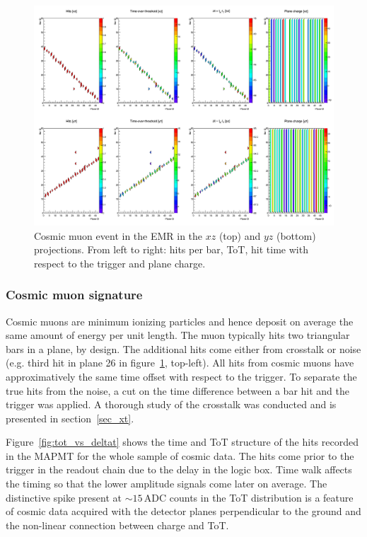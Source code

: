 \documentclass[a4paper,11pt]{article}
\begin{document}
\begin{figure}[!htr]
\centering
\includegraphics[width=\textwidth]{cosmic_event.png}
\caption{Cosmic muon event in the EMR in the $xz$ (top) and $yz$ (bottom) projections. From left to right: hits per bar, ToT, hit time
with respect to the trigger and plane charge.}
\label{fig:cosmic_muon}
\end{figure}

\subsubsection{Cosmic muon signature}\label{sec:cosmic_sig}
Cosmic muons are minimum ionizing particles and hence deposit on average the same amount of energy per unit length. The muon typically hits two triangular
bars in a plane, by design. The additional hits come either from crosstalk or noise (e.g. third hit in plane 26 in figure~\ref{fig:cosmic_muon}, top-left).
All hits from cosmic muons have approximatively the same time offset with respect to the trigger. To separate the true hits from the noise, a cut on
the time difference between a bar hit and the trigger was applied. A thorough study of the crosstalk was conducted and is presented in section~\ref{sec_xt}.
 
Figure~\ref{fig:tot_vs_deltat} shows the time and ToT structure of the hits recorded in the MAPMT for the whole sample of cosmic data. The hits come prior
to the trigger in the readout chain due to the delay in the logic box. Time walk affects the timing so that the lower amplitude signals come later on
average. The distinctive spike present at $\sim15$\,ADC counts in the ToT distribution is a feature of cosmic data acquired with the detector planes
perpendicular to the ground and the non-linear connection between charge and ToT.
\end{document}
